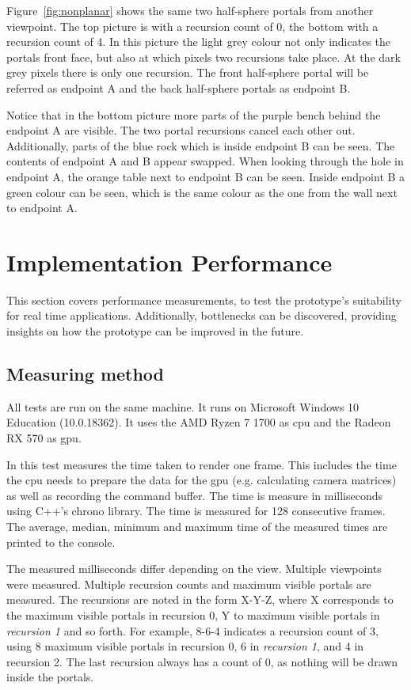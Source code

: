 Figure~\ref{fig:nonplanar} shows the same two half-sphere portals from another viewpoint. The top picture is with a recursion count of 0, the bottom with a recursion count of 4. In this picture the light grey colour not only indicates the portals front face, but also at which pixels two recursions take place. At the dark grey pixels there is only one recursion. The front half-sphere portal will be referred as \gls{endpoint} A and the back half-sphere portals as \gls{endpoint} B.

Notice that in the bottom picture more parts of the purple bench behind the \gls{endpoint} A are visible. The two portal recursions cancel each other out. Additionally, parts of the blue rock which is inside \gls{endpoint} B can be seen. The contents of \gls{endpoint} A and B appear swapped. When looking through the hole in \gls{endpoint} A, the orange table next to \gls{endpoint} B can be seen. Inside \gls{endpoint} B a green colour can be seen, which is the same colour as the one from the wall next to \gls{endpoint} A.

\section{Implementation Performance}
\label{section:performancemeasurement}

This section covers performance measurements, to test the prototype's suitability for real time applications. Additionally, bottlenecks can be discovered, providing insights on how the prototype can be improved in the future.

\subsection{Measuring method}
All tests are run on the same machine. It runs on Microsoft Windows 10 Education (10.0.18362). It uses the AMD Ryzen 7 1700 as \gls{cpu} and the Radeon RX 570 as \gls{gpu}.

In this test measures the time taken to render one frame. This includes the time the \gls{cpu} needs to prepare the data for the \gls{gpu} (e.g. calculating camera matrices) as well as recording the command buffer. The time is measure in milliseconds using C++'s chrono library. The time is measured for 128 consecutive frames. The average, median, minimum and maximum time of the measured times are printed to the console.


The measured milliseconds differ depending on the view. Multiple viewpoints were measured. Multiple recursion counts and maximum visible portals are measured. The recursions are noted in the form X-Y-Z, where X corresponds to the maximum visible portals in recursion 0, Y to maximum visible portals in \textit{recursion 1} and so forth. For example, 8-6-4 indicates a recursion count of 3, using 8 maximum visible portals in recursion 0, 6 in \textit{recursion 1}, and 4 in recursion 2. The last recursion always has a count of 0, as nothing will be drawn inside the portals. 

